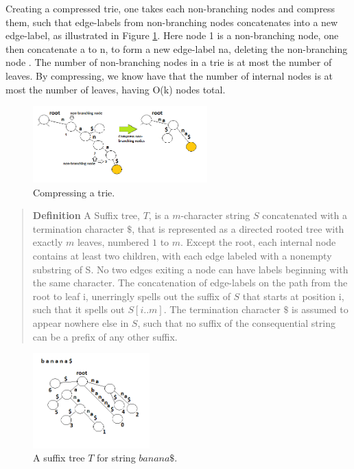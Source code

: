 \documentclass[12pt]{article} %
\begin{document}
\newline
Creating a compressed trie, one takes each non-branching nodes and compress them, such that edge-labels from non-branching nodes concatenates into a new edge-label, as illustrated in Figure \ref{fig:comprestrie}. Here node 1 is a non-branching node, one then concatenate a to n, to form a new edge-label na, deleting the non-branching node \cite{mit}. The number of non-branching nodes in a trie is at most the number of leaves. By compressing, we know have that the number of internal nodes is at most the number of leaves, having O(k) nodes total.
\newline

\begin{figure}[h]
    \centering
    \includegraphics[width=0.6\textwidth]{compressingtrie}
    \captionsetup{width=0.8\textwidth}
    \caption{Compressing a trie.}
    \label{fig:comprestrie}
\end{figure}
\begin{quote}
\textbf{Definition}   A Suffix tree, $T$, is a $m$-character string $S$ concatenated with a termination character $\$$, that is represented as a directed rooted tree with exactly $m$ leaves, numbered $1$ to $m$. Except the root, each internal node contains at least two children, with each edge labeled with a nonempty substring of S. No two edges exiting a node can have labels beginning with the same character. The concatenation of edge-labels on the path from the root to leaf i, unerringly spells out the suffix of $S$ that starts at position i, such that it spells out $S[i..m]$. The termination character $\$$ is assumed to appear nowhere else in $S$, such that no suffix of the consequential string can be a prefix of any other suffix\cite{gusfield}.
\end{quote}
\begin{figure}[h]
    \centering
    \includegraphics[width=0.4\textwidth]{suffixtree(banana)}
    \captionsetup{width=0.8\textwidth}
    \caption{A suffix tree $T$ for string $banana\$$.}
    \label{fig:suffixTree}
\end{figure}
\end{document}
